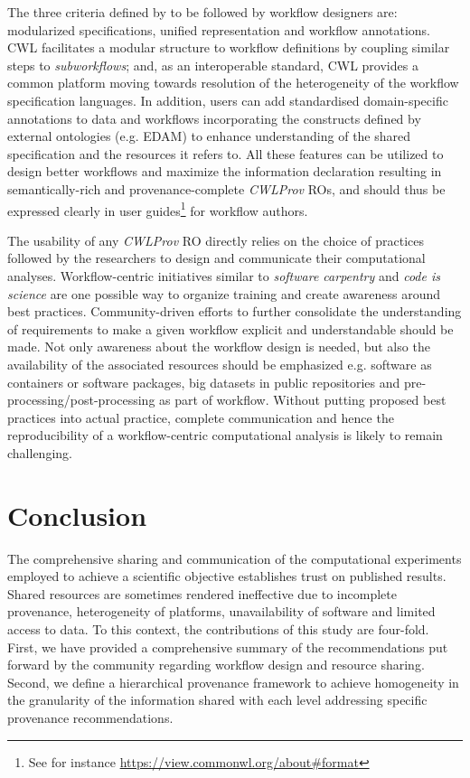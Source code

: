 \documentclass[a4paper,num-refs]{oup-contemporary}
\begin{document}
The three criteria defined by \citet{cohen2017scientific} to be followed by workflow designers are: modularized specifications, unified representation and workflow annotations. CWL facilitates a modular structure to workflow definitions by coupling similar steps to \textit{subworkflows}; and, as an interoperable standard, CWL provides a common platform moving towards resolution of the heterogeneity of the workflow specification languages. In addition, users can add standardised domain-specific annotations to data and workflows incorporating the constructs defined by external ontologies (e.g. EDAM) to enhance understanding of the shared specification and the resources it refers to. All these features can be utilized to design better workflows and maximize the information declaration resulting in semantically-rich and provenance-complete \textit{CWLProv} ROs, and should thus be expressed clearly in user guides\footnote{See for instance \url{https://view.commonwl.org/about\#format}} for workflow authors.

The usability of any \textit{CWLProv} RO directly relies on the choice of practices followed by the researchers to design and communicate their computational analyses. Workflow-centric initiatives similar to \textit{software carpentry} \citep{softwarecarpentry} and \textit{code is science} \citep{CodeIsSc} are one possible way to organize training and create awareness around best practices. Community-driven efforts to further consolidate the understanding of requirements to make a given workflow explicit and understandable should be made. Not only awareness about the workflow design is needed, but also the availability of the associated resources should be emphasized e.g. software as containers or software packages, big datasets in public repositories and pre-processing/post-processing as part of workflow. Without putting proposed best practices into actual practice, complete communication and hence the reproducibility of a workflow-centric computational analysis is likely to remain challenging. 

\section{Conclusion} \label{sec:conclusion}
The comprehensive sharing and communication of the computational experiments employed to achieve a scientific objective establishes trust on published results. Shared resources are sometimes rendered ineffective due to incomplete provenance, heterogeneity of platforms, unavailability of software and limited access to data. To this context, the contributions of this study are four-fold. First, we have provided a comprehensive summary of the recommendations put forward by the community regarding workflow design and resource sharing. Second, we define a hierarchical provenance framework to achieve homogeneity in the granularity of the information shared  with each level addressing specific provenance recommendations.
\end{document}
